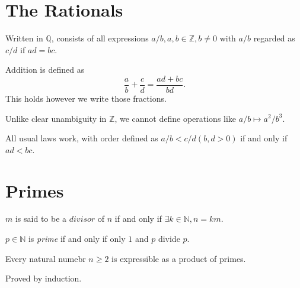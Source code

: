 \documentclass[10pt]{article}
\begin{document}
	\section{The Rationals}
	Written in $ \mathbb{Q} $, consists of all expressions $ a/b, a,b\in \mathbb{Z}, b\neq 0 $ with $ a/b $ regarded as $ c/d $ if $ad=bc$.

	Addition is defined as 
	\[
		\frac{a}{b}+\frac{c}{d} = \frac{ad+bc}{bd}
	.\]
	This holds however we write those fractions.
	\begin{remark}
		Unlike clear unambiguity in $\mathbb{Z}$, we cannot define operations like $ a/b\mapsto a^2/b^3 $.
	\end{remark}

	All usual laws work, with order defined as $ a/b<c/d(b,d>0) $ if and only if $ ad<bc $.

	\section{Primes}
	\begin{definition}
		$m$ is said to be a $divisor$ of $n$ if and only if $\exists k\in \mathbb{N} , n=km$.

		$ p\in \mathbb{N} $ is \textit{prime} if and only if only $1$ and $p$ divide $p$.
	\end{definition}
	\begin{proposition}\label{prop:factor_into_primes}
		Every natural numebr $n\ge 2$ is expressible as a product of primes.
	\end{proposition}
	Proved by induction.
\end{document}
